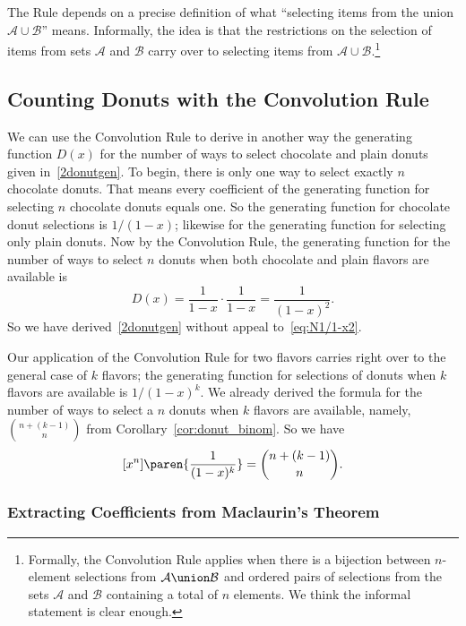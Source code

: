 The Rule depends on a precise definition of what ``selecting items
from the union $\mathcal{A} \cup \mathcal{B}$'' means.  Informally,
the idea is that the restrictions on the selection of items from sets
$\mathcal{A}$ and $\mathcal{B}$ carry over to selecting items from
$\mathcal{A} \cup \mathcal{B}$.\footnote{Formally, the Convolution
  Rule applies when there is a bijection between $n$-element
  selections from $\mathcal{A} \union \mathcal{B}$ and ordered pairs
  of selections from the sets $\mathcal{A}$ and $\mathcal{B}$
  containing a total of $n$ elements.  We think the informal statement
  is clear enough.}

\subsection{Counting Donuts with the Convolution Rule}

We can use the Convolution Rule to derive in another way the
generating function $D(x)$ for the number of ways to select chocolate
and plain donuts given in~\eqref{2donutgen}.  To begin, there is only
one way to select exactly $n$ chocolate donuts.  That means every
coefficient of the generating function for selecting $n$ chocolate
donuts equals one.  So the generating function for chocolate donut
selections is $1/(1-x)$; likewise for the generating function for
selecting only plain donuts.  Now by the Convolution Rule, the
generating function for the number of ways to select $n$ donuts when
both chocolate and plain flavors are available is
\[
D(x) = \frac{1}{1-x} \cdot \frac{1}{1-x} = \frac{1}{(1-x)^2}.
\]
So we have derived~\eqref{2donutgen} without appeal
to~\eqref{eq:N1/1-x2}.

Our application of the Convolution Rule for two flavors carries right
over to the general case of $k$ flavors; the generating function for
selections of donuts when $k$ flavors are available is $1/(1-x)^k$.
We already derived the formula for the number of ways to select a $n$
donuts when $k$ flavors are available, namely, $\binom{n+(k-1)}{n}$
from Corollary~\ref{cor:donut_binom}.  So we have
\begin{equation}\label{eq:donut_coefficient}
[x^n]\paren{\frac{1}{(1-x)^k}} = \binom{n+(k-1)}{n}.
\end{equation}


\subsubsection{Extracting Coefficients from Maclaurin's Theorem}

